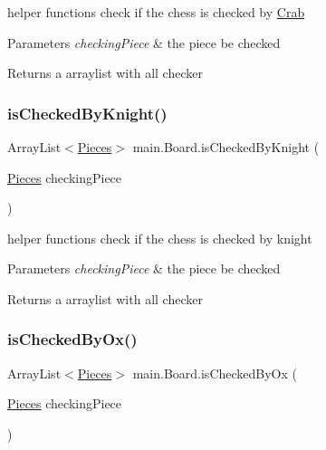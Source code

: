 helper functions check if the chess is checked by \mbox{\hyperlink{classmain_1_1_crab}{Crab}} 
\begin{DoxyParams}{Parameters}
{\em checking\+Piece} & the piece be checked \\
\hline
\end{DoxyParams}
\begin{DoxyReturn}{Returns}
a arraylist with all checker 
\end{DoxyReturn}
\mbox{\label{classmain_1_1_board_aff11960be7cf5b8b39099b830dfcff03}} 
\subsubsection{\texorpdfstring{is\+Checked\+By\+Knight()}{isCheckedByKnight()}}
{\footnotesize\ttfamily Array\+List$<$\mbox{\hyperlink{classmain_1_1_pieces}{Pieces}}$>$ main.\+Board.\+is\+Checked\+By\+Knight (\begin{DoxyParamCaption}\item[{\mbox{\hyperlink{classmain_1_1_pieces}{Pieces}}}]{checking\+Piece }\end{DoxyParamCaption})\hspace{0.3cm}{\ttfamily [inline]}}

helper functions check if the chess is checked by knight 
\begin{DoxyParams}{Parameters}
{\em checking\+Piece} & the piece be checked \\
\hline
\end{DoxyParams}
\begin{DoxyReturn}{Returns}
a arraylist with all checker 
\end{DoxyReturn}
\mbox{\label{classmain_1_1_board_a701432c0e3bfdabf18f7251f585fe709}} 
\subsubsection{\texorpdfstring{is\+Checked\+By\+Ox()}{isCheckedByOx()}}
{\footnotesize\ttfamily Array\+List$<$\mbox{\hyperlink{classmain_1_1_pieces}{Pieces}}$>$ main.\+Board.\+is\+Checked\+By\+Ox (\begin{DoxyParamCaption}\item[{\mbox{\hyperlink{classmain_1_1_pieces}{Pieces}}}]{checking\+Piece }\end{DoxyParamCaption})\hspace{0.3cm}{\ttfamily [inline]}}

